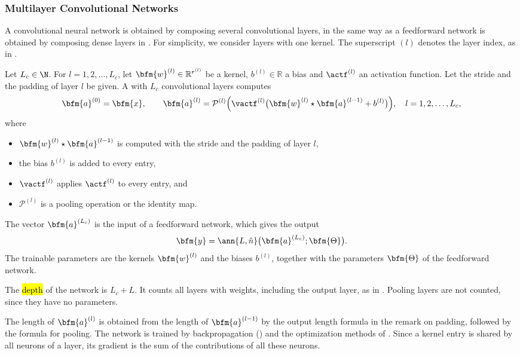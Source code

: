 \subsubsection{Multilayer Convolutional Networks}
A convolutional neural network is obtained by composing several convolutional layers, in the same way as a feedforward network is obtained by composing dense layers in . For simplicity, we consider layers with one kernel. The superscript $(l)$ denotes the layer index, as in .
\begin{definition}
Let $L_c\in\N$. For $l = 1, 2, \ldots, L_c$, let $\bfm{w}^{(l)}\in\mathbb{R}^{r^{(l)}}$ be a kernel, $b^{(l)}\in\mathbb{R}$ a bias and $\actf^{(l)}$ an activation function. Let the stride and the padding of layer $l$ be given. A  with $L_c$ convolutional layers computes
$$
\bfm{a}^{(0)} = \bfm{x},
\qquad
\bfm{a}^{(l)} = \mathcal{P}^{(l)}\Big(\vactf^{(l)}\big(\bfm{w}^{(l)} \star \bfm{a}^{(l-1)} + b^{(l)}\big)\Big),
\quad l = 1, 2, \ldots, L_c,
$$
where
\begin{itemize}
\item $\bfm{w}^{(l)} \star \bfm{a}^{(l-1)}$ is computed with the stride and the padding of layer $l$,
\item the bias $b^{(l)}$ is added to every entry,
\item $\vactf^{(l)}$ applies $\actf^{(l)}$ to every entry, and
\item $\mathcal{P}^{(l)}$ is a pooling operation or the identity map.
\end{itemize}
The vector $\bfm{a}^{(L_c)}$ is the input of a feedforward network, which gives the output
$$
\bfm{y} = \ann{L,\hat{n}}\big(\bfm{a}^{(L_c)};\bfm{\Theta}\big).
$$
The trainable parameters are the kernels $\bfm{w}^{(l)}$ and the biases $b^{(l)}$, together with the parameters $\bfm{\Theta}$ of the feedforward network.
\end{definition}
\begin{note}
The \hl{depth} of the network is $L_c + L$. It counts all layers with weights, including the output layer, as in . Pooling layers are not counted, since they have no parameters.
\end{note}
The length of $\bfm{a}^{(l)}$ is obtained from the length of $\bfm{a}^{(l-1)}$ by the output length formula in the remark on padding, followed by the formula for pooling. The network is trained by backpropagation () and the optimization methods of . Since a kernel entry is shared by all neurons of a layer, its gradient is the sum of the contributions of all these neurons.
